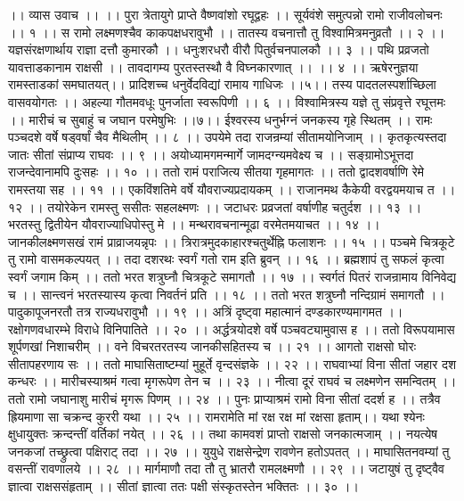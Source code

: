 ।। व्यास उवाच ।। ।।
पुरा त्रेतायुगे प्राप्ते वैष्णवांशो रघूद्वहः ।।
सूर्यवंशे समुत्पन्नो रामो राजीवलोचनः ।। १ ।।
स रामो लक्ष्मणश्चैव काकपक्षधरावुभौ ।।
तातस्य वचनात्तौ तु विश्वामित्रमनुव्रतौ ।। २ ।।
यज्ञसंरक्षणार्थाय राज्ञा दत्तौ कुमारकौ ।।
धनुःशरधरौ वीरौ पितुर्वचनपालकौ ।। ३ ।।
पथि प्रव्रजतो यावत्ताडकानाम राक्षसी ।।
तावदागम्य पुरतस्तस्थौ वै विघ्नकारणात् ।। ।। ४ ।।
ऋषेरनुज्ञया रामस्ताडकां समघातयत्।।
प्रादिशच्च धनुर्वेदविद्यां रामाय गाधिजः ।।५।।
तस्य पादतलस्पर्शाच्छिला वासवयोगतः ।।
अहल्या गौतमवधूः पुनर्जाता स्वरूपिणी ।। ६ ।।
विश्वामित्रस्य यज्ञे तु संप्रवृत्ते रघूत्तमः ।।
मारीचं च सुबाहुं च जघान परमेषुभिः ।।७।।
ईश्वरस्य धनुर्भग्नं जनकस्य गृहे स्थितम् ।।
रामः पञ्चदशे वर्षे षड्वर्षां चैव मैथिलीम् ।। ८ ।।
उपयेमे तदा राजन्रम्यां सीतामयोनिजाम् ।।
कृतकृत्यस्तदा जातः सीतां संप्राप्य राघवः ।। ९ ।।
अयोध्यामगमन्मार्गे जामदग्न्यमवेक्ष्य च ।।
सङ्ग्रामोऽभूत्तदा राजन्देवानामपि दुःसहः ।। १० ।।
ततो रामं पराजित्य सीतया गृहमागतः ।।
ततो द्वादशवर्षाणि रेमे रामस्तया सह ।। ११ ।।
एकविंशतिमे वर्षे यौवराज्यप्रदायकम् ।।
राजानमथ कैकेयी वरद्वयमयाच त ।। १२ ।।
तयोरेकेन रामस्तु ससीतः सहलक्ष्मणः ।।
जटाधरः प्रव्रजतां वर्षाणीह चतुर्दश ।। १३ ।।
भरतस्तु द्वितीयेन यौवराज्याधिपोस्तु मे ।।
मन्थरावचनान्मूढा वरमेतमयाचत ।। १४ ।।
जानकीलक्ष्मणसखं रामं प्राव्राजयन्नृपः ।।
त्रिरात्रमुदकाहारश्चतुर्थेह्नि फलाशनः ।। १५ ।।
पञ्चमे चित्रकूटे तु रामो वासमकल्पयत् ।।
तदा दशरथः स्वर्गं गतो राम इति ब्रुवन् ।। १६ ।।
ब्रह्मशापं तु सफलं कृत्वा स्वर्गं जगाम किम् ।।
ततो भरत शत्रुघ्नौ चित्रकूटे समागतौ ।। १७ ।।
स्वर्गतं पितरं राजन्रामाय विनिवेद्य च ।।
सान्त्वनं भरतस्यास्य कृत्वा निवर्तनं प्रति ।। १८ ।।
ततो भरत शत्रुघ्नौ नन्दिग्रामं समागतौ ।।
पादुकापूजनरतौ तत्र राज्यधरावुभौ ।। १९ ।।
अत्रिं दृष्ट्वा महात्मानं दण्डकारण्यमागमत ।।
रक्षोगणवधारम्भे विराधे विनिपातिते ।। २० ।।
अर्द्धत्रयोदशे वर्षे पञ्चवट्यामुवास ह ।।
ततो विरूपयामास शूर्पणखां निशाचरीम् ।।
वने विचरतरतस्य जानकीसहितस्य च ।। २१ ।।
आगतो राक्षसो घोरः सीतापहरणाय सः ।।
ततो माघासिताष्टम्यां मुहूर्ते वृन्दसंज्ञके ।। २२ ।।
राघवाभ्यां विना सीतां जहार दश कन्धरः ।।
मारीचस्याश्रमं गत्वा मृगरूपेण तेन च ।। २३ ।।
नीत्वा दूरं राघवं च लक्ष्मणेन समन्वितम् ।।
ततो रामो जघानाशु मारीचं मृगरू पिणम् ।। २४ ।।
पुनः प्राप्याश्रमं रामो विना सीतां ददर्श ह ।।
तत्रैव ह्रियमाणा सा चक्रन्द कुररी यथा ।। २५ ।।
रामरामेति मां रक्ष रक्ष मां रक्षसा हृताम्।।
यथा श्येनः क्षुधायु्क्तः क्रन्दन्तीं वर्तिकां नयेत् ।। २६ ।।
तथा कामवशं प्राप्तो राक्षसो जनकात्मजाम् ।।
नयत्येष जनकजां तच्छ्रुत्वा पक्षिराट् तदा ।। २७ ।।
युयुधे राक्षसेन्द्रेण रावणेन हतोऽपतत् ।।
माघासितनवम्यां तु वसन्तीं रावणालये ।। २८ ।।
मार्गमाणौ तदा तौ तु भ्रातरौ रामलक्ष्मणौ ।। २९ ।।
जटायुषं तु दृष्ट्वैव ज्ञात्वा राक्षससंहृताम् ।।
सीतां ज्ञात्वा ततः पक्षी संस्कृतस्तेन भक्तितः ।। ३० ।।
